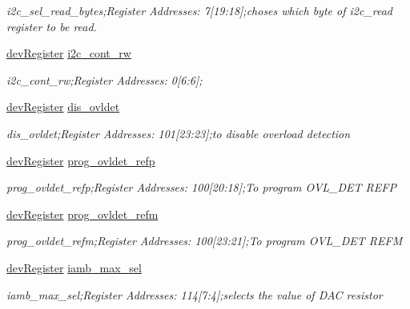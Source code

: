 \begin{DoxyCompactItemize}
\begin{DoxyCompactList}\small\item\em i2c\+\_\+sel\+\_\+read\+\_\+bytes;Register Addresses\+: 7\mbox{[}19\+:18\mbox{]};choses which byte of i2c\+\_\+read register to be read. \end{DoxyCompactList}\item 
\mbox{\hyperlink{classdev_register}{dev\+Register}} \mbox{\hyperlink{class_o_p_t3101_registers_ae5bde1d46ee3c6d51052c09e1ad84f84}{i2c\+\_\+cont\+\_\+rw}}
\begin{DoxyCompactList}\small\item\em i2c\+\_\+cont\+\_\+rw;Register Addresses\+: 0\mbox{[}6\+:6\mbox{]}; \end{DoxyCompactList}\item 
\mbox{\hyperlink{classdev_register}{dev\+Register}} \mbox{\hyperlink{class_o_p_t3101_registers_abeddf7ddc169440a2a338ee7c7a721b9}{dis\+\_\+ovldet}}
\begin{DoxyCompactList}\small\item\em dis\+\_\+ovldet;Register Addresses\+: 101\mbox{[}23\+:23\mbox{]};to disable overload detection \end{DoxyCompactList}\item 
\mbox{\hyperlink{classdev_register}{dev\+Register}} \mbox{\hyperlink{class_o_p_t3101_registers_ac41346a3341dc33f7085fbaa56947ad6}{prog\+\_\+ovldet\+\_\+refp}}
\begin{DoxyCompactList}\small\item\em prog\+\_\+ovldet\+\_\+refp;Register Addresses\+: 100\mbox{[}20\+:18\mbox{]};To program O\+V\+L\+\_\+\+D\+ET R\+E\+FP \end{DoxyCompactList}\item 
\mbox{\hyperlink{classdev_register}{dev\+Register}} \mbox{\hyperlink{class_o_p_t3101_registers_ac2bb471d2455d0fb9a96a368003f7f59}{prog\+\_\+ovldet\+\_\+refm}}
\begin{DoxyCompactList}\small\item\em prog\+\_\+ovldet\+\_\+refm;Register Addresses\+: 100\mbox{[}23\+:21\mbox{]};To program O\+V\+L\+\_\+\+D\+ET R\+E\+FM \end{DoxyCompactList}\item 
\mbox{\hyperlink{classdev_register}{dev\+Register}} \mbox{\hyperlink{class_o_p_t3101_registers_afc1b16c376d9ac5d8991c247ef3546e6}{iamb\+\_\+max\+\_\+sel}}
\begin{DoxyCompactList}\small\item\em iamb\+\_\+max\+\_\+sel;Register Addresses\+: 114\mbox{[}7\+:4\mbox{]};selects the value of D\+AC resistor \end{DoxyCompactList}\item 

\end{DoxyCompactItemize}
